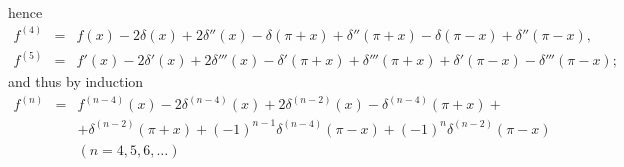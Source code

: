 {\begin{enumerate}
\begin{eqnarray*}
\end{eqnarray*}
hence
\begin{eqnarray*}
   f^{(4)}   &=   &f(x)-2\delta(x)+2\delta''(x)-
             \delta(\pi+x)+\delta''(\pi+x)-\delta(\pi-x)+\delta''(\pi-x), \\
   f^{(5)}   &=   &f'(x)-2\delta'(x)+2\delta'''(x)-
             \delta'(\pi + x)+\delta'''(\pi + x)+\delta'(\pi - x)-
             \delta'''(\pi - x);
\end{eqnarray*}
and thus  by induction
\begin{eqnarray*}
 f^{(n)}&=&f^{(n-4)}(x)-2\delta^{(n-4)}(x)+
             2\delta^{(n-2)}(x)-\delta^{(n-4)}(\pi+x)+\\
   &&+\delta^{(n-2)}(\pi+x)+(-1)^{n-1}
             \delta^{(n-4)}(\pi-x)+(-1)^n\delta^{(n-2)}(\pi-x)\\
   &&(n=4,5,6,\dots)
\end{eqnarray*}



\end{enumerate}

\eexample
}


\begin{center}
{\color{olive}   \Huge
\floweroneleft
}
\end{center}


